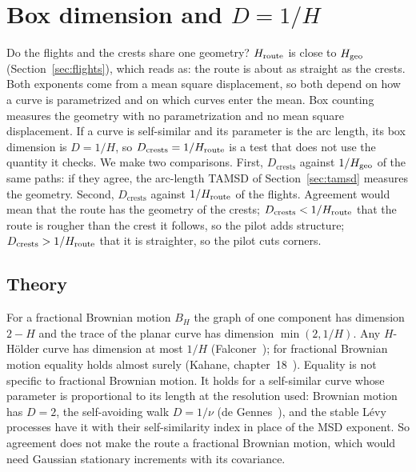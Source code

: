 \section{Box dimension and \texorpdfstring{$D=1/H$}{D = 1/H}}\label{sec:dimension}

Do the flights and the crests share one geometry? $H_{\mathrm{route}}$ is close to $H_{\mathrm{geo}}$ (Section~\ref{sec:flights}), which reads as: the route is about as
straight as the crests. Both exponents come from a mean square displacement, so both depend on how a curve is parametrized and on which curves enter the mean.
Box counting measures the geometry with no parametrization and no mean square displacement. If a curve is self-similar and its parameter is the arc
length, its box dimension is $D=1/H$, so $D_{\mathrm{crests}}=1/H_{\mathrm{route}}$ is a test that does not use the quantity it checks. We make two comparisons.
First, $D_{\mathrm{crests}}$ against $1/H_{\mathrm{geo}}$ of the same paths: if they agree, the arc-length TAMSD of Section~\ref{sec:tamsd} measures the geometry.
Second, $D_{\mathrm{crests}}$ against $1/H_{\mathrm{route}}$ of the flights. Agreement would mean that the route has the geometry of the crests;
$D_{\mathrm{crests}}<1/H_{\mathrm{route}}$ that the route is rougher than the crest it follows, so the pilot adds structure; $D_{\mathrm{crests}}>1/H_{\mathrm{route}}$ that it is straighter, so the pilot cuts corners.

\subsection{Theory}

For a fractional Brownian motion $B_H$ the graph of one component has dimension $2-H$ and the trace of the planar curve has dimension $\min(2,1/H)$. Any $H$-H\"older curve has dimension
at most $1/H$ (Falconer~\cite{falconer}); for fractional Brownian motion equality holds almost surely (Kahane, chapter~18~\cite{kahane}). Equality is not specific to fractional Brownian
motion. It holds for a self-similar curve whose parameter is proportional to its length at the resolution used: Brownian motion has $D=2$, the self-avoiding walk $D=1/\nu$
(de Gennes~\cite{degennes}), and the stable L\'evy processes have it with their self-similarity index in place of the MSD exponent. So agreement does not make the route a fractional Brownian motion,
which would need Gaussian stationary increments with its covariance.

